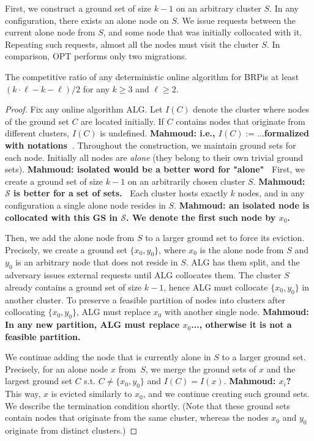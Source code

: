 \documentclass[manuscript,screen=true, review, anonymous]{acmart}
\newcommand{\OPT}{\textsf{OPT}\xspace}
\newcommand{\ALG}{\textsf{ALG}\xspace}
\newcommand{\OBRP}{BRP}
\newcommand\mahmoud[1]{\color{orange}\textbf{Mahmoud: #1~}\color{black}}
\begin{document}
First, we construct a ground set of size $k-1$ on an arbitrary cluster $S$.
In any configuration, there exists an alone node on $S$.
We issue requests between the current alone node from $S$, and some node that was initially collocated with it.
Repeating such requests, almost all the nodes must visit the cluster $S$.
In comparison, \OPT performs only two migrations.

\begin{theorem}
	\label{th:lowerbound}
	The competitive ratio of any deterministic online algorithm for \OBRP is at least $(k\cdot \ell - k - \ell)/2$ for any $k\geq 3$ and $\ell \geq 2$.
\end{theorem}

\begin{proof}
	Fix any online algorithm \ALG{}.
	Let $I(C)$ denote the cluster where nodes of the ground set $C$ are located initially.
	If $C$ contains nodes that originate from different clusters, $I(C)$ is undefined.
	\mahmoud{i.e., $I(C):=...$formalized with notations}.
	Throughout the construction, we maintain ground sets for each node.
	Initially all nodes are \emph{alone} (they belong to their own trivial ground sets).
\mahmoud{isolated would be a better word for "alone"}
	First, we create a ground set of size $k-1$ on an arbitrarily chosen cluster $S$.
	\mahmoud{$\mathcal{S}$ is better for a set of sets.}
	Each cluster hosts exactly $k$ nodes, and in any configuration a single alone node resides in $S$. \mahmoud{an isolated node is collocated with  this GS in $\mathcal{S}$. We denote the first such node by $x_0$.}

	Then, we add the alone node from $S$ to a larger ground set to force its eviction.
	Precisely,
	we create a ground set $\{x_0, y_0\}$, 
	where $x_0$ is the alone node from $S$ and $y_0$ is an arbitrary node that does not reside in $S$.
	\ALG has them split, and the adversary issues external requests until \ALG collocates them.
	The cluster $S$ already contains a ground set of size $k-1$, hence \ALG must collocate $\{x_0, y_0\}$ in another cluster.
	To preserve a feasible partition of nodes into clusters after collocating $\{x_0, y_0\}$,
	\ALG must replace $x_0$ with another single node.
	\mahmoud{In any new partition, \ALG must replace $x_0$..., otherwise it is not a feasible partition.}
	

	We continue adding the node that is currently alone in $S$ to a larger ground set.
	Precisely, for an alone node $x$ from~$S$, we merge the ground sets of $x$ and the largest ground set $C$ s.t. $C \neq \{x_0,y_0\}$ and $I(C) = I(x)$.
	\mahmoud{$x_i$?}
	This way, $x$ is evicted similarly to $x_0$, and we continue creating such ground sets.
	We describe the termination condition shortly.
	(Note that these ground sets contain nodes that originate from the same cluster, whereas the nodes $x_0$ and $y_0$ originate from distinct clusters.)


\end{proof}
\end{document}
